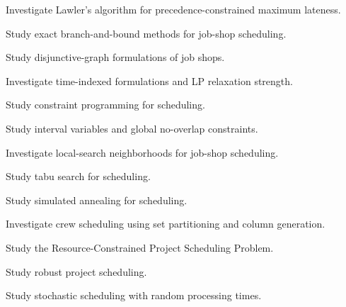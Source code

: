 \begin{exercise}[4]
Investigate Lawler's algorithm for precedence-constrained maximum lateness.
\end{exercise}

\begin{exercise}[4]
Study exact branch-and-bound methods for job-shop scheduling.
\end{exercise}

\begin{exercise}[4]
Study disjunctive-graph formulations of job shops.
\end{exercise}

\begin{exercise}[4]
Investigate time-indexed formulations and LP relaxation strength.
\end{exercise}

\begin{exercise}[4]
Study constraint programming for scheduling.
\end{exercise}

\begin{exercise}[4]
Study interval variables and global no-overlap constraints.
\end{exercise}

\begin{exercise}[4]
Investigate local-search neighborhoods for job-shop scheduling.
\end{exercise}

\begin{exercise}[4]
Study tabu search for scheduling.
\end{exercise}

\begin{exercise}[4]
Study simulated annealing for scheduling.
\end{exercise}

\begin{exercise}[4]
Investigate crew scheduling using set partitioning and column generation.
\end{exercise}

\begin{exercise}[4]
Study the Resource-Constrained Project Scheduling Problem.
\end{exercise}

\begin{exercise}[4]
Study robust project scheduling.
\end{exercise}

\begin{exercise}[4]
Study stochastic scheduling with random processing times.
\end{exercise}

